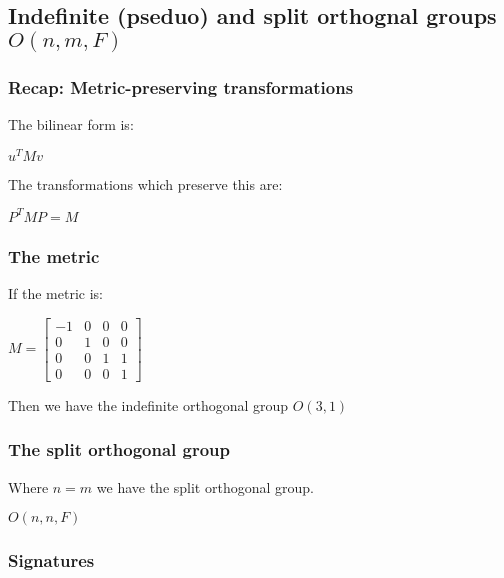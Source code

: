 
\subsection{Indefinite (pseduo) and split orthognal groups \(O(n,m,F)\)}

\subsubsection{Recap: Metric-preserving transformations}

The bilinear form is:

\(u^TMv\)

The transformations which preserve this are:

\(P^TMP=M\)

\subsubsection{The metric}

If the metric is:

\(M=\begin{bmatrix}-1 & 0 & 0 & 0\\0 & 1 & 0 & 0\\0 & 0 & 1 & 1\\0 & 0 & 0 & 1\end{bmatrix}\)

Then we have the indefinite orthogonal group \(O(3,1)\)

\subsubsection{The split orthogonal group}

Where \(n=m\) we have the split orthogonal group.

\(O(n,n,F)\)

\subsubsection{Signatures}


